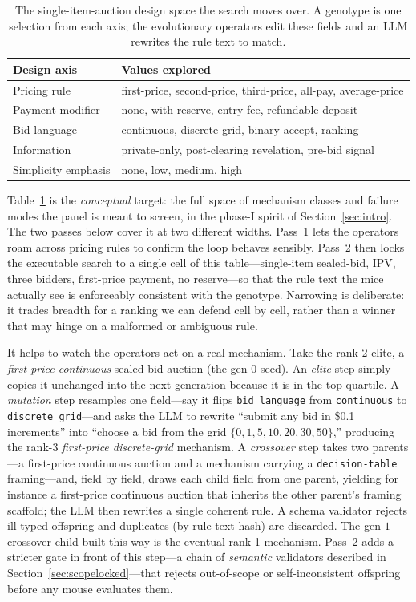 \documentclass[12pt]{article}
\begin{document}
\begin{table}[t]
\centering
\caption{The single-item-auction design space the search moves over. A genotype is
one selection from each axis; the evolutionary operators edit these fields and an
LLM rewrites the rule text to match.}
\label{tab:designspace}
\small
\setlength{\tabcolsep}{6pt}
\begin{tabular}{@{}ll@{}}
\toprule
Design axis & Values explored \\
\midrule
Pricing rule        & first-price, second-price, third-price, all-pay, average-price \\
Payment modifier    & none, with-reserve, entry-fee, refundable-deposit \\
Bid language        & continuous, discrete-grid, binary-accept, ranking \\
Information          & private-only, post-clearing revelation, pre-bid signal \\
Simplicity emphasis & none, low, medium, high \\
\bottomrule
\end{tabular}
\end{table}

Table~\ref{tab:designspace} is the \emph{conceptual} target: the full space of
mechanism classes and failure modes the panel is meant to screen, in the phase-I
spirit of Section~\ref{sec:intro}. The two passes below cover it at two different
widths. Pass~1 lets the operators roam across pricing rules to confirm the loop
behaves sensibly. Pass~2 then locks the executable search to a single cell of this
table---single-item sealed-bid, IPV, three bidders, first-price payment, no
reserve---so that the rule text the mice actually see is enforceably consistent with
the genotype. Narrowing is deliberate: it trades breadth for a ranking we can defend
cell by cell, rather than a winner that may hinge on a malformed or ambiguous rule.

It helps to watch the operators act on a real mechanism. Take the rank-2 elite, a
\emph{first-price continuous} sealed-bid auction (the gen-$0$ seed). An
\emph{elite} step simply copies it unchanged into the next generation because it is
in the top quartile. A \emph{mutation} step resamples one field---say it flips
\texttt{bid\_language} from \texttt{continuous} to \texttt{discrete\_grid}---and
asks the LLM to rewrite ``submit any bid in \$0.1 increments'' into ``choose a bid
from the grid $\{0,1,5,10,20,30,50\}$,'' producing the rank-3 \emph{first-price
discrete-grid} mechanism. A \emph{crossover} step takes two parents---a first-price
continuous auction and a mechanism carrying a \texttt{decision-table} framing---and,
field by field, draws each child field from one parent, yielding for instance a
first-price continuous auction that inherits the other parent's framing scaffold;
the LLM then rewrites a single coherent rule. A schema validator rejects ill-typed
offspring and duplicates (by rule-text hash) are discarded. The gen-$1$ crossover
child built this way is the eventual rank-1 mechanism. Pass~2 adds a stricter gate
in front of this step---a chain of \emph{semantic} validators described in
Section~\ref{sec:scopelocked}---that rejects out-of-scope or self-inconsistent
offspring before any mouse evaluates them.
\end{document}
